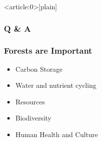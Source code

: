 \documentclass[aspectratio=169]{beamer}
\begin{document}
{ %
    \begin{frame}<article:0>[plain]
      \frametitle{Q \& A}
     \end{frame}
}


\begin{frame}
  \frametitle{Forests are Important}

  \begin{itemize}
  \item Carbon Storage \pause
  \item Water and nutrient cycling \pause
  \item Resources \pause
  \item Biodiversity \pause
  \item Human Health and Culture 
  \end{itemize}

\end{frame}
\end{document}
